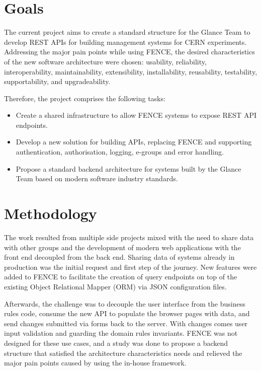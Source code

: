 \section{Goals}

The current project aims to create a standard structure for the Glance Team to develop REST APIs for building management systems for CERN experiments. Addressing the major pain points while using FENCE, the desired characteristics of the new software architecture were chosen: usability, reliability, interoperability, maintainability, extensibility, installability, reusability, testability, supportability, and upgradeability. 

Therefore, the project comprises the following tasks:
\begin{itemize}
    \item Create a shared infrastructure to allow FENCE systems to expose REST API endpoints.
    \item Develop a new solution for building APIs, replacing FENCE and supporting authentication, authorisation, logging, e-groups and error handling.
    \item Propose a standard backend architecture for systems built by the Glance Team based on modern software industry standards.
\end{itemize}


\section{Methodology}

The work resulted from multiple side projects mixed with the need to share data with other groups and the development of modern web applications with the front end decoupled from the back end.
Sharing data of systems already in production was the initial request and first step of the journey. New features were added to FENCE to facilitate the creation of query endpoints on top of the existing Object Relational Mapper (ORM) via JSON configuration files.

Afterwards, the challenge was to decouple the user interface from the business rules code, consume the new API to populate the browser pages with data, and send changes submitted via forms back to the server. With changes comes user input validation and guarding the domain rules invariants. FENCE was not designed for these use cases, and a study was done to propose a backend structure that satisfied the architecture characteristics needs and relieved the major pain points caused by using the in-house framework.

